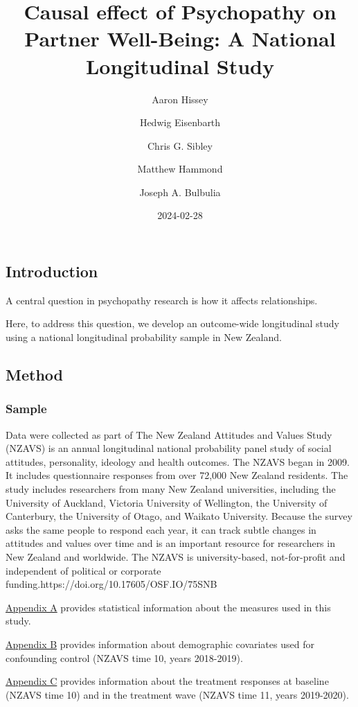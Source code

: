 \documentclass[
  singlecolumn]{article}
\title{Causal effect of Psychopathy on Partner Well-Being: A National
Longitudinal Study}
\author{Aaron Hissey \and Hedwig Eisenbarth \and Chris G.
Sibley \and Matthew Hammond \and Joseph A. Bulbulia}
\date{2024-02-28}
\begin{document}
\maketitle

\subsection{Introduction}\label{introduction}

A central question in psychopathy research is how it affects
relationships.

Here, to address this question, we develop an outcome-wide longitudinal
study using a national longitudinal probability sample in New Zealand.

\subsection{Method}\label{method}

\subsubsection{Sample}\label{sample}

Data were collected as part of The New Zealand Attitudes and Values
Study (NZAVS) is an annual longitudinal national probability panel study
of social attitudes, personality, ideology and health outcomes. The
NZAVS began in 2009. It includes questionnaire responses from over
72,000 New Zealand residents. The study includes researchers from many
New Zealand universities, including the University of Auckland, Victoria
University of Wellington, the University of Canterbury, the University
of Otago, and Waikato University. Because the survey asks the same
people to respond each year, it can track subtle changes in attitudes
and values over time and is an important resource for researchers in New
Zealand and worldwide. The NZAVS is university-based, not-for-profit and
independent of political or corporate
funding.https://doi.org/10.17605/OSF.IO/75SNB

\hyperref[appendix-measures]{Appendix A} provides statistical
information about the measures used in this study.

\hyperref[appendix-demographics]{Appendix B} provides information about
demographic covariates used for confounding control (NZAVS time 10,
years 2018-2019).

\hyperref[appendix-exposures]{Appendix C} provides information about the
treatment responses at baseline (NZAVS time 10) and in the treatment
wave (NZAVS time 11, years 2019-2020).
\end{document}
